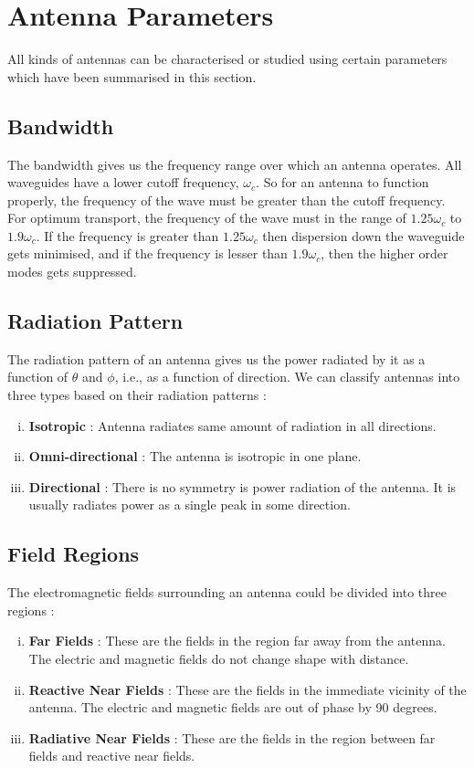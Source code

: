 \documentclass[12pt]{article}
\begin{document}
\section{Antenna Parameters}
All kinds of antennas can be characterised or studied using certain parameters which have been summarised in this section. 
\subsection{Bandwidth}
The bandwidth gives us the frequency range over which an antenna operates. All waveguides have a lower cutoff frequency, $\omega_c$. So for an antenna to function properly, the frequency of the wave must be greater than the cutoff frequency. For optimum transport, the frequency of the wave must in the range of $1.25 \omega_c$ to $1.9\omega_c$. If the frequency is greater than $1.25\omega_c$ then dispersion down the waveguide gets minimised, and if the frequency is lesser than $1.9\omega_c$, then the higher order modes gets suppressed. 
\subsection{Radiation Pattern}
The radiation pattern of an antenna gives us the power radiated by it as a function of $\theta$ and $\phi$, i.e., as a function of direction. \linebreak
We can classify antennas into three types based on their radiation patterns :
\begin{enumerate}[i.)]
  \item \textbf{Isotropic} : Antenna radiates same amount of radiation in all directions.
  \item \textbf{Omni-directional} : The antenna is isotropic in one plane.
  \item \textbf{Directional} : There is no symmetry is power radiation of the antenna. It is usually radiates power as a single peak in some direction.
\end{enumerate}
\subsection{Field Regions}
The electromagnetic fields surrounding an antenna could be divided into three regions :
\begin{enumerate}[i.)]
  \item \textbf{Far Fields} : These are the fields in the region far away from the antenna. The electric and magnetic fields do not change shape with distance.
  \item \textbf{Reactive Near Fields} : These are the fields in the immediate vicinity of the antenna. The electric and magnetic fields are out of phase by 90 degrees.
  \item \textbf{Radiative Near Fields} : These are the fields in the region between far fields and reactive near fields.
\end{enumerate}
\end{document}
